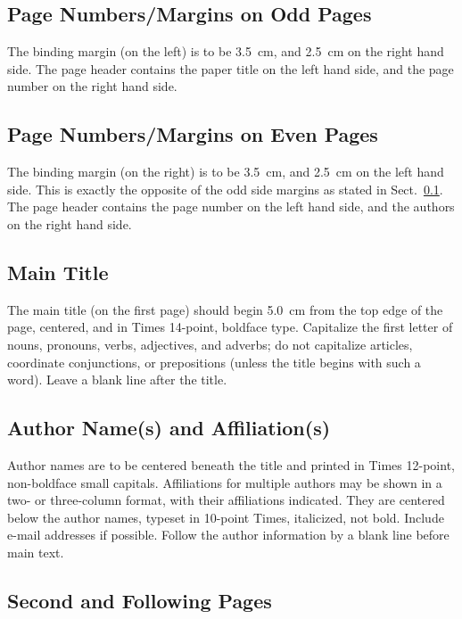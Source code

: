 \documentclass[a4paper,twoside]{arlims}
\begin{document}
\subsection{Page Numbers/Margins on Odd Pages}
\label{sect:OddPageFormatting}

The binding margin (on the left) is to be 3.5~cm, and 2.5~cm on the
right hand side. The page header contains the paper title on the left
hand side, and the page number on the right hand side.


\subsection{Page Numbers/Margins on Even Pages}

The binding margin (on the right) is to be 3.5~cm, and 2.5~cm on the
left hand side. This is exactly the opposite of the odd side margins
as stated in Sect.~\ref{sect:OddPageFormatting}. The page header
contains the page number on the left hand side, and the authors on the
right hand side.


\subsection{Main Title}
\label{sect:MainTritle}

The main title (on the first page) should begin 5.0~cm from the top
edge of the page, centered, and in Times 14-point, boldface type.
Capitalize the first letter of nouns, pronouns, verbs, adjectives, and
adverbs; do not capitalize articles, coordinate conjunctions, or
prepositions (unless the title begins with such a word).  Leave a
blank line after the title.

\subsection{Author Name(s) and Affiliation(s)}
\label{sect:Authors}

Author names are to be centered beneath the title and printed in Times
12-point, non-boldface small capitals. Affiliations for multiple
authors may be shown in a two- or three-column format, with their
affiliations indicated. They are centered below the author names,
typeset in 10-point Times, italicized, not bold. Include e-mail
addresses if possible.  Follow the author information by a blank line
before main text.

\subsection{Second and Following Pages}
\label{sect:FollowingPages}
\end{document}
